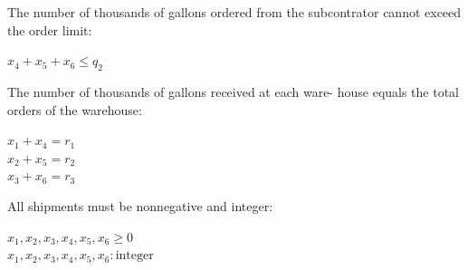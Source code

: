 \documentclass[14 pt]{beamer}
\begin{document}
\begin{frame}[t]
\begin{columns}[t]
\begin{column}{0.45\textwidth}
The number of thousands of gallons ordered from the subcontrator cannot exceed the order limit: 
\begin{center}
  $x_4 + x_5 + x_6 \leq q_2$
\end{center}

The number of thousands of gallons received at each ware- house equals the total orders of the warehouse:
\begin{center}
  $x_1 + x_4  = r_1$ \\
  $x_2 + x_5  = r_2$ \\
  $x_3 + x_6  = r_3$
\end{center}

All shipments must be nonnegative and integer:
\begin{center}
  $x_1, x_2, x_3, x_4, x_5, x_6 \geq 0$ \\
  $x_1, x_2, x_3, x_4, x_5, x_6 : \text{integer}$ 
\end{center}
\end{column}
\end{columns}
\end{frame}

\end{document}
